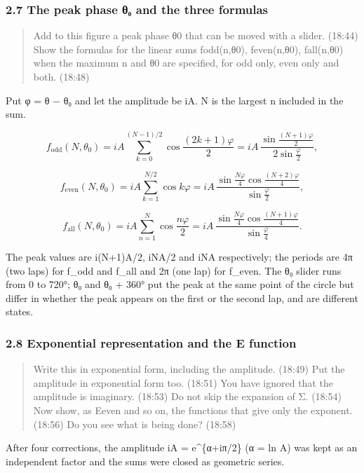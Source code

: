 \documentclass[
  a4paper,
]{article}
\begin{document}
\subsubsection{2.7 The peak phase θ₀ and the three
formulas}\label{the-peak-phase-ux3b8ux2080-and-the-three-formulas}

\begin{quote}
Add to this figure a peak phase θ0 that can be moved with a slider.
(18:44) Show the formulas for the linear sums fodd(n,θ0), feven(n,θ0),
fall(n,θ0) when the maximum n and θ0 are specified, for odd only, even
only and both. (18:48)
\end{quote}

Put φ = θ − θ₀ and let the amplitude be iA. N is the largest n included
in the sum.

\[
f_{\mathrm{odd}}(N,\theta_0)=iA\sum_{k=0}^{(N-1)/2}\cos\frac{(2k+1)\varphi}{2}=iA\,\frac{\sin\frac{(N+1)\varphi}{2}}{2\sin\frac{\varphi}{2}},
\]

\[
f_{\mathrm{even}}(N,\theta_0)=iA\sum_{k=1}^{N/2}\cos k\varphi=iA\,\frac{\sin\frac{N\varphi}{4}\cos\frac{(N+2)\varphi}{4}}{\sin\frac{\varphi}{2}},
\]

\[
f_{\mathrm{all}}(N,\theta_0)=iA\sum_{n=1}^{N}\cos\frac{n\varphi}{2}=iA\,\frac{\sin\frac{N\varphi}{4}\cos\frac{(N+1)\varphi}{4}}{\sin\frac{\varphi}{4}}.
\]

The peak values are i(N+1)A/2, iNA/2 and iNA respectively; the periods
are 4π (two laps) for f\_odd and f\_all and 2π (one lap) for f\_even.
The θ₀ slider runs from 0 to 720°; θ₀ and θ₀ + 360° put the peak at the
same point of the circle but differ in whether the peak appears on the
first or the second lap, and are different states.

\subsubsection{2.8 Exponential representation and the E
function}\label{exponential-representation-and-the-e-function}

\begin{quote}
Write this in exponential form, including the amplitude. (18:49) Put the
amplitude in exponential form too. (18:51) You have ignored that the
amplitude is imaginary. (18:53) Do not skip the expansion of Σ. (18:54)
Now show, as Eeven and so on, the functions that give only the exponent.
(18:56) Do you see what is being done? (18:58)
\end{quote}

After four corrections, the amplitude iA = e\^{}\{α+iπ/2\} (α = ln A)
was kept as an independent factor and the sums were closed as geometric
series.
\end{document}

